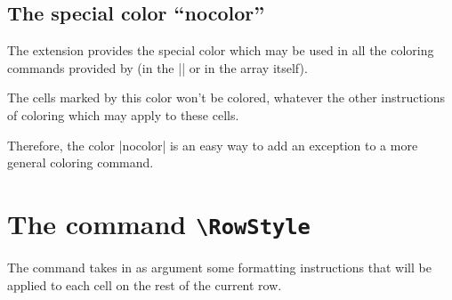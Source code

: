 \documentclass[dvipsnames]{article}
\begin{document}
\subsection[The special color "nocolor"]{The special color ``nocolor''}


The extension  provides the special color 
which may be used in all the coloring commands provided by  (in
the |\CodeBefore| or in the array itself).

The cells marked by this color won't be colored, whatever the other instructions
of coloring which may apply to these cells.

Therefore, the color |nocolor| is an easy way to add an exception to a more
general coloring command.

\section{The command \texttt{\textbackslash RowStyle}}

\label{RowStyle}

The command  takes in as argument some formatting
instructions that will be applied to each cell on the rest of the current row.
\end{document}
